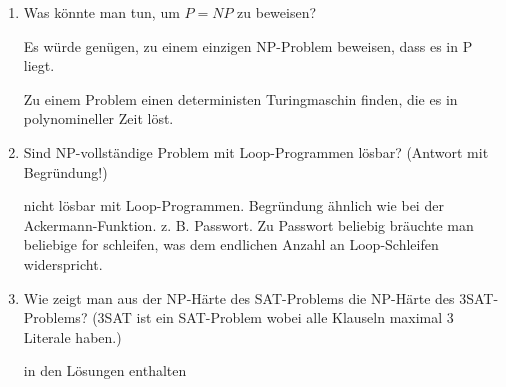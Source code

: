 \documentclass{bschlangaul-aufgabe}
\begin{document}
\begin{enumerate}

\item Was könnte man tun, um $P = NP$ zu beweisen?

\begin{liAntwort}
Es würde genügen, zu einem einzigen NP-Problem beweisen, dass es in P
liegt.

Zu einem Problem einen deterministen Turingmaschin finden, die es
in polynomineller Zeit löst.
\end{liAntwort}



\item Sind NP-vollständige Problem mit Loop-Programmen lösbar? (Antwort
mit Begründung!)

\begin{liAntwort}
nicht lösbar mit Loop-Programmen. Begründung ähnlich wie bei der
Ackermann-Funktion. z. B. Passwort. Zu Passwort beliebig bräuchte man
beliebige for schleifen, was dem endlichen Anzahl an Loop-Schleifen
widerspricht.
\end{liAntwort}



\item Wie zeigt man aus der NP-Härte des SAT-Problems die NP-Härte des
3SAT-Problems? (3SAT ist ein SAT-Problem wobei alle Klauseln maximal 3
Literale haben.)

\begin{liAntwort}
in den Lösungen enthalten
\end{liAntwort}

\end{enumerate}
\end{document}
